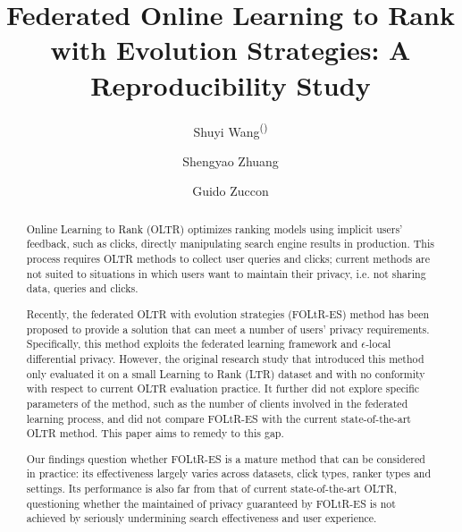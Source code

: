 \documentclass[runningheads]{llncs}
\begin{document}
\title{Federated Online Learning to Rank with Evolution Strategies: A Reproducibility Study}

\author{Shuyi Wang\textsuperscript{(\Letter)}
	\and 
	Shengyao Zhuang
	\and 
	Guido Zuccon}


\maketitle

\begin{abstract}
Online Learning to Rank (OLTR) optimizes ranking models using implicit users' feedback, such as clicks, directly manipulating search engine results in production. This process requires OLTR methods to collect user queries and clicks; current methods are not suited to situations in which users want to maintain their privacy, i.e. not sharing data, queries and clicks. 

Recently, the federated OLTR with evolution strategies (FOLtR-ES) method has been proposed to provide a solution that can meet a number of users' privacy requirements. Specifically, this method exploits the federated learning framework and $\epsilon$-local differential privacy. However, the original research study that introduced this method only evaluated it on a small Learning to Rank (LTR) dataset and with no conformity with respect to current OLTR evaluation practice. It further did not explore specific parameters of the method, such as the number of clients involved in the federated learning process, and did not compare FOLtR-ES with the current state-of-the-art OLTR method. This paper aims to remedy to this gap. 

Our findings question whether FOLtR-ES is a mature method that can be considered in practice: its effectiveness largely varies across datasets, click types, ranker types and settings. Its performance is also far from that of current state-of-the-art OLTR, questioning whether the maintained of privacy guaranteed by FOLtR-ES is not achieved by seriously undermining search effectiveness and user experience. 

\end{abstract}
\end{document}
